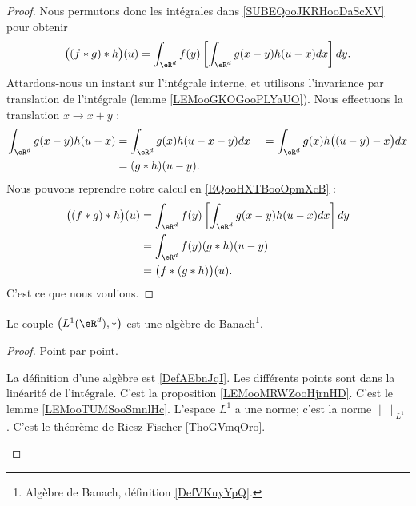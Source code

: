 \begin{proof}
	Nous permutons donc les intégrales dans \eqref{SUBEQooJKRHooDaScXV} pour obtenir
	\begin{equation}        \label{EQooHXTBooOpmXcB}
		\big( (f*g)*h \big)(u)=\int_{\eR^d}f(y)\left[ \int_{\eR^d}g(x-y)h(u-x)dx \right]dy.
	\end{equation}
	Attardons-nous un instant sur l'intégrale interne, et utilisons l'invariance par translation de l'intégrale (lemme \ref{LEMooGKOGooPLYaUO}). Nous effectuons la translation \( x\to x+y\) :
	\begin{subequations}
		\begin{align}
			\int_{\eR^d}g(x-y)h(u-x) & =\int_{\eR^d}g(x)h(u-x-y)dx\
			                         & =\int_{\eR^d}g(x)h\big( (u-y)-x \big)dx \\
			                         & =(g*h)(u-y).
		\end{align}
	\end{subequations}
	Nous pouvons reprendre notre calcul en \eqref{EQooHXTBooOpmXcB} :
	\begin{subequations}
		\begin{align}
			\big( (f*g)*h \big)(u) & =\int_{\eR^d}f(y)\left[ \int_{\eR^d}g(x-y)h(u-x)dx \right]dy \\
			                       & =\int_{\eR^d}f(y)(g*h)(u-y)                                  \\
			                       & =\big( f*(g*h) \big)(u).
		\end{align}
	\end{subequations}
	C'est ce que nous voulions.
\end{proof}

\begin{proposition}     \label{PROPooNBHNooInwoar}
	Le couple \( \big( L^1(\eR^d), * \big)\) est une algèbre de Banach\footnote{Algèbre de Banach, définition \ref{DefVKuyYpQ}.}.
\end{proposition}

\begin{proof}
	Point par point.
	\begin{subproof}
		\spitem[Algèbre]
		La définition d'une algèbre est \ref{DefAEbnJqI}. Les différents points sont dans la linéarité de l'intégrale.
		\spitem[Commutative]
		C'est la proposition \ref{LEMooMRWZooHjrnHD}.
		\spitem[Associative]
		C'est le lemme \ref{LEMooTUMSooSmnlHc}.
		\spitem[Normé]
		L'espace \( L^1\) a une norme; c'est la norme \( \|  \|_{L^1}\).
		\spitem[Complet]
		C'est le théorème de Riesz-Fischer \ref{ThoGVmqOro}.
	\end{subproof}
\end{proof}

